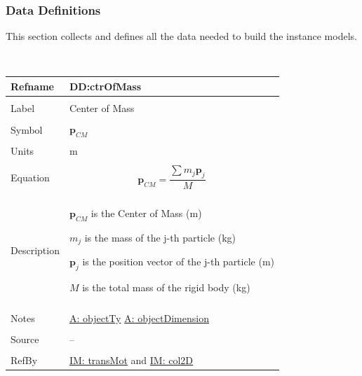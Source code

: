\documentclass[12pt]{article}
\begin{document}
\subsubsection{Data Definitions}
\label{Sec:DDs}
This section collects and defines all the data needed to build the instance models.
\par~

\noindent \begin{minipage}{\textwidth}
          \begin{tabular}{>{\raggedright}p{}>{\raggedright\arraybackslash}p{}}
          \toprule \textbf{Refname} & \textbf{DD:ctrOfMass}
          \label{DD:ctrOfMass}
          \\ \midrule \\
          Label & Center of Mass
          \\ \midrule \\
          Symbol & ${\mathbf{p}_{CM}}$
          \\ \midrule \\
          Units & m
          \\ \midrule \\
          Equation & \begin{displaymath}
                     {\mathbf{p}_{CM}}=\frac{\displaystyle\sum{{m_{j}} {\mathbf{p}_{j}}}}{M}
                     \end{displaymath}
          \\ \midrule \\
          Description & \begin{symbDescription}
                        \item{${\mathbf{p}_{CM}}$ is the Center of Mass (m)}
                        \item{${m_{j}}$ is the mass of the j-th particle (kg)}
                        \item{${\mathbf{p}_{j}}$ is the position vector of the j-th particle (m)}
                        \item{$M$ is the total mass of the rigid body (kg)}
                        \end{symbDescription}
          \\ \midrule \\
          Notes & \hyperref[assumpOT]{A: objectTy}
                  \hyperref[assumpOD]{A: objectDimension}
          \\ \midrule \\
          Source & --
          \\ \midrule \\
          RefBy & \hyperref[IM:transMot]{IM: transMot} and \hyperref[IM:col2D]{IM: col2D}
          \\ \bottomrule
          \end{tabular}
          \end{minipage}
\par~
\end{document}
